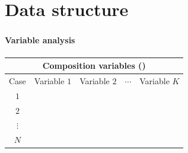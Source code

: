 \documentclass[8pt]{beamer}
\begin{document}





\section{Data structure}

\bgroup
{}
\begin{frame}[plain]{}
\begin{center}
\color{white}{\Huge\insertsection}
\end{center}
\end{frame}
\egroup


\begin{frame}
\frametitle{\insertsection}
\framesubtitle{Variable analysis}

\footnotesize
\centering
\begin{tabular}{ccccc}
\multicolumn{5}{c}{Composition variables ({\color{blue}{attributes}})}\\
\toprule
Case & Variable $1$ & Variable $2$ & $\cdots$ & Variable $K$\\
\hline
$1$           \\
$2$           \\
$\vdots$      \\
$N$           \\
\bottomrule
\end{tabular}

\end{frame}

\end{document}

